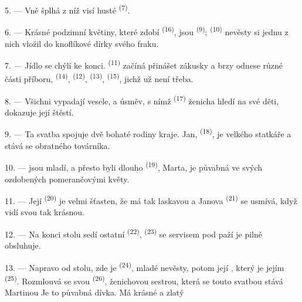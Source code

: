 5. --- Vně  šplhá  z níž visí husté 
\textsuperscript{(7)}.

6. --- Krásné podzimní květiny, které zdobí  \textsuperscript{(16)}, jsou
 \textsuperscript{(9)};  \textsuperscript{(10)}
nevěsty si jednu z nich vložil do knoflíkové dírky svého fraku.

7. --- Jídlo se chýlí ke konci.  \textsuperscript{(11)} začíná přinášet
zákusky a brzy odnese různé části příboru,  \textsuperscript{(14)},
 \textsuperscript{(12)},  \textsuperscript{(13)},
 \textsuperscript{(15)}, jichž už není třeba.

\VUsaut{3.0mm}

8. --- Všichni vypadají vesele, a úsměv, s nímž  \textsuperscript{(17)}
ženicha hledí na své děti, dokazuje její štěstí.

9. --- Ta svatba spojuje dvě bohaté rodiny kraje. Jan, 
\textsuperscript{(18)}, je  velkého statkáře a stává se 
obratného továrníka.

10. ---  jsou mladí, a přesto byli dlouho 
 \textsuperscript{(19)}, Marta, je půvabná ve svých  ozdobených pomerančovými květy.

11. --- Její  \textsuperscript{(20)} je velmi šťasten, že má tak
laskavou  a Janova  \textsuperscript{(21)} se usmívá,
když vidí svou  tak krásnou.

12. --- Na konci stolu sedí ostatní  \textsuperscript{(22)},
 
\textsuperscript{(23)} se servisem pod paží je pilně obsluhuje.

\VUsaut{3.0mm}

13. --- Napravo od stolu, zde je  \textsuperscript{(24)},
 mladé nevěsty, potom její , který je jejím
 \textsuperscript{(25)}. Rozmlouvá se svou 
\textsuperscript{(26)}, ženichovou sestrou, která se touto svatbou stává Martinou
 Je to půvabná dívka. Má krásné 
a zlatý 

